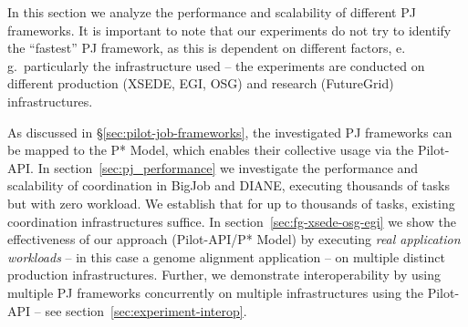 \documentclass[conference]{IEEEtran}
\begin{document}
In this section we analyze the performance and scalability of
different PJ frameworks.  It is important to note that our experiments
do not try to identify the ``fastest'' PJ framework, as
this is dependent on different factors, e.\,g.\ particularly the
infrastructure used -- the experiments are conducted on different
production (XSEDE, EGI, OSG) and research (FutureGrid) infrastructures. 

As discussed in \S\ref{sec:pilot-job-frameworks}, the investigated PJ
frameworks can be mapped to the P* Model, which enables their
collective usage via the Pilot-API. In
section~\ref{sec:pj_performance} we investigate the performance and
scalability of coordination in BigJob and DIANE, executing thousands
of tasks but with zero workload. We establish that for up to thousands
of tasks, existing coordination infrastructures suffice.  In
section~\ref{sec:fg-xsede-osg-egi} we show the effectiveness of our
approach (Pilot-API/P* Model) by executing {\it real application
  workloads} -- in this case a genome alignment application -- on
multiple distinct production infrastructures. Further, we demonstrate
interoperability by using multiple PJ frameworks concurrently on
multiple infrastructures using the Pilot-API -- see
section~\ref{sec:experiment-interop}.









\end{document}
